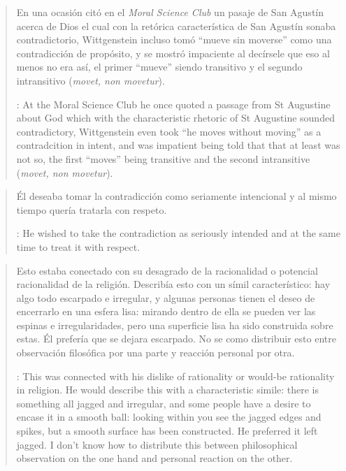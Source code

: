 \blockquote[{\cite[122]{anscombe1981parmenides:qli}}: At the Moral Science Club he once quoted a passage from St Augustine about God which with the characteristic rhetoric of St Augustine sounded contradictory, Wittgenstein even took ``he moves without moving'' as a contradcition in intent, and was impatient being told that that at least was not so, the first ``moves'' being transitive and the second intransitive (\emph{movet, non movetur}).]{En una ocasión citó en el \emph{Moral Science Club} un pasaje de San Agustín acerca de Dios el cual con la retórica característica de San Agustín sonaba contradictorio, Wittgenstein incluso tomó ``mueve sin moverse'' como una contradicción de propósito, y se mostró impaciente al decírsele que eso al menos no era así, el primer ``mueve'' siendo transitivo y el segundo intransitivo (\emph{movet, non movetur}).}

\blockquote[{\cite[122]{anscombe1981parmenides:qli}}: He wished to take the contradiction as seriously intended and at the same time to treat it with respect.]{Él deseaba tomar la contradicción como seriamente intencional y al mismo tiempo quería tratarla con respeto.}

\blockquote[{\cite[122]{anscombe1981parmenides:qli}}: This was connected with his dislike of rationality or would-be rationality in religion. He would describe this with a characteristic simile: there is something all jagged and irregular, and some people have a desire to encase it in a smooth ball: looking within you see the jagged edges and spikes, but a smooth surface has been constructed. He preferred it left jagged. I don't know how to distribute this between philosophical observation on the one hand and personal reaction on the other.]{Esto estaba conectado con su desagrado de la racionalidad o potencial racionalidad de la religión. Describía esto con un símil característico: hay algo todo escarpado e irregular, y algunas personas tienen el deseo de encerrarlo en una esfera lisa: mirando dentro de ella se pueden ver las espinas e irregularidades, pero una superficie lisa ha sido construida sobre estas. Él prefería que se dejara escarpado. No se como distribuir esto entre observación filosófica por una parte y reacción personal por otra.}

